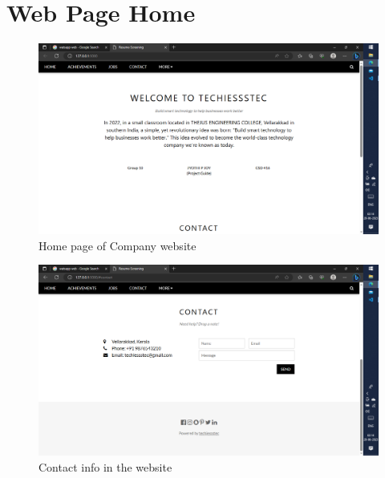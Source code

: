 \documentclass[12 pt, oneside]{book}
\begin{document}

\section{Web Page Home}
\begin{figure}[h]
 \begin{center}
		\includegraphics[width = 8 cm]{home.png}
		\caption{Home page of Company website}
		\label{ab}	\end{center}
\end{figure}
\begin{figure}[h]
 \begin{center}
		\includegraphics[width = 8 cm]{contact.png}
		\caption{Contact info in the website}
		\label{ab}	\end{center}
\end{figure}
\end{document}
